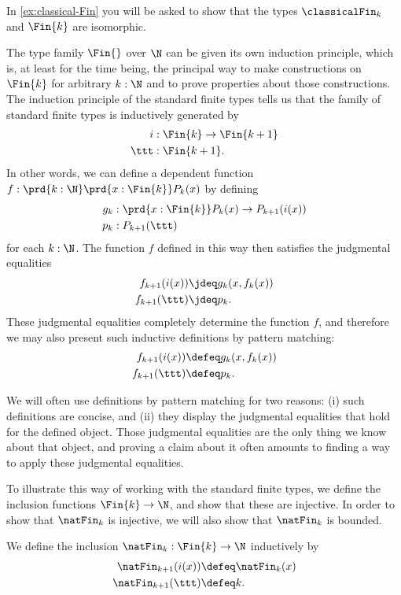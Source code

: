 In \cref{ex:classical-Fin} you will be asked to show that the types $\classicalFin_k$ and $\Fin{k}$ are isomorphic.

\begin{rmk}
The type family $\Fin{}$ over $\N$ can be given its own induction principle, which is, at least for the time being, the principal way to make constructions on $\Fin{k}$ for arbitrary $k:\N$ and to prove properties about those constructions. The induction principle of the standard finite types tells us that the family of standard finite types is inductively generated by
\begin{align*}
  i & : \Fin{k}\to\Fin{k+1} \\*
  \ttt & : \Fin{k+1}. 
\end{align*}
In other words, we can define a dependent function $f:\prd{k:\N}\prd{x:\Fin{k}}P_k(x)$ by defining
\begin{align*}
  g_k & : \prd{x:\Fin{k}}P_k(x)\to P_{k+1}(i(x)) \\*
  p_k & : P_{k+1}(\ttt)
\end{align*}
for each $k:\N$. The function $f$ defined in this way then satisfies the judgmental equalities
\begin{align*}
  f_{k+1}(i(x)) & \jdeq g_k(x,f_k(x)) \\*
  f_{k+1}(\ttt) & \jdeq p_k.
\end{align*}
These judgmental equalities completely determine the function $f$, and therefore we may also present such inductive definitions by pattern matching:
  \begin{align*}
    f_{k+1}(i(x)) & \defeq g_k(x,f_k(x)) \\*
    f_{k+1}(\ttt) & \defeq p_k.
  \end{align*}
\end{rmk}

We will often use definitions by pattern matching for two reasons: (i) such definitions are concise, and (ii) they display the judgmental equalities that hold for the defined object. Those judgmental equalities are the only thing we know about that object, and proving a claim about it often amounts to finding a way to apply these judgmental equalities.

To illustrate this way of working with the standard finite types, we define the inclusion functions $\Fin{k}\to\N$, and show that these are injective. In order to show that $\natFin_k$ is injective, we will also show that $\natFin_k$ is bounded.

\begin{defn}\label{defn:natFin}
  We define the inclusion $\natFin_k : \Fin{k}\to\N$ inductively by
  \begin{align*}
    \natFin_{k+1}(i(x)) & \defeq \natFin_{k}(x) \\
    \natFin_{k+1}(\ttt) & \defeq k.
  \end{align*}
\end{defn}

